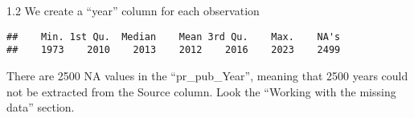 \documentclass[
]{article}
\newenvironment{Shaded}{\begin{snugshade}}{\end{snugshade}}
\newcommand{\CommentTok}[1]{\textcolor[rgb]{0.56,0.35,0.01}{\textit{#1}}}
\newcommand{\FunctionTok}[1]{\textcolor[rgb]{0.13,0.29,0.53}{\textbf{#1}}}
\newcommand{\NormalTok}[1]{#1}
\newcommand{\OtherTok}[1]{\textcolor[rgb]{0.56,0.35,0.01}{#1}}
\newcommand{\SpecialCharTok}[1]{\textcolor[rgb]{0.81,0.36,0.00}{\textbf{#1}}}
\newcommand{\StringTok}[1]{\textcolor[rgb]{0.31,0.60,0.02}{#1}}
\begin{document}
1.2 We create a ``year'' column for each observation

\begin{Shaded}
\end{Shaded}

\begin{verbatim}
##    Min. 1st Qu.  Median    Mean 3rd Qu.    Max.    NA's 
##    1973    2010    2013    2012    2016    2023    2499
\end{verbatim}

There are 2500 NA values in the ``pr\_pub\_Year'', meaning that 2500
years could not be extracted from the Source column. Look the ``Working
with the missing data'' section.
\end{document}
